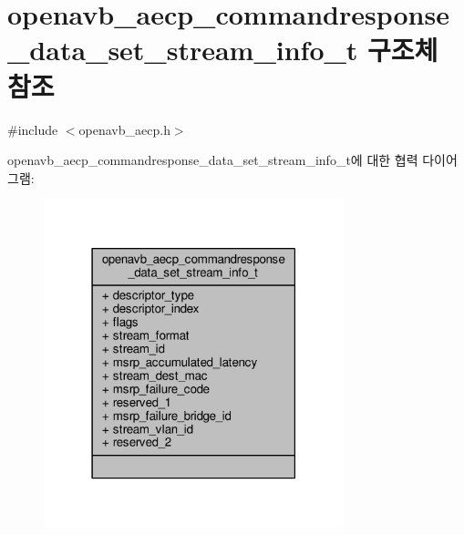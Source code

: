 \hypertarget{structopenavb__aecp__commandresponse__data__set__stream__info__t}{}\section{openavb\+\_\+aecp\+\_\+commandresponse\+\_\+data\+\_\+set\+\_\+stream\+\_\+info\+\_\+t 구조체 참조}
\label{structopenavb__aecp__commandresponse__data__set__stream__info__t}


{\ttfamily \#include $<$openavb\+\_\+aecp.\+h$>$}



openavb\+\_\+aecp\+\_\+commandresponse\+\_\+data\+\_\+set\+\_\+stream\+\_\+info\+\_\+t에 대한 협력 다이어그램\+:
\nopagebreak
\begin{figure}[H]
\begin{center}
\leavevmode
\includegraphics[width=247pt]{structopenavb__aecp__commandresponse__data__set__stream__info__t__coll__graph}
\end{center}
\end{figure}
